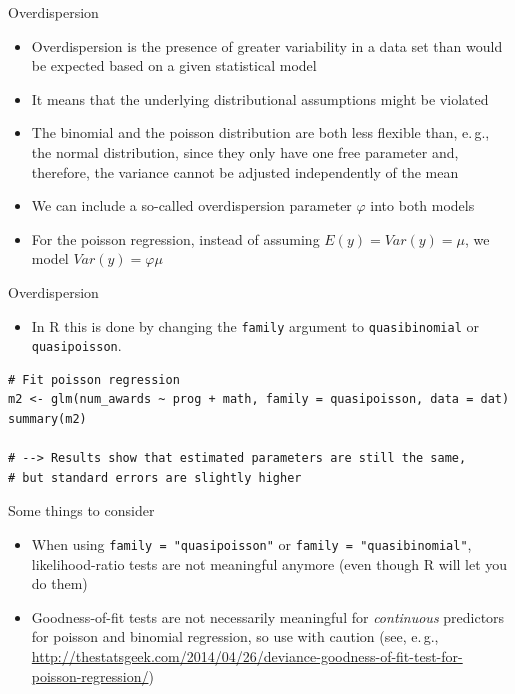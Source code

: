 \documentclass[aspectratio=169]{beamer}
\begin{document}
\begin{frame}{Overdispersion}
  \begin{itemize}
    \item Overdispersion is the presence of greater variability in a data
      set than would be expected based on a given statistical model
    \item It means that the underlying distributional assumptions might be
      violated
    \item The binomial and the poisson distribution are both less flexible
      than, e.\,g., the normal distribution, since they only have one free
      parameter and, therefore, the variance cannot be adjusted
      independently of the mean
    \item We can include a so-called overdispersion parameter $\varphi$
      into both models
    \item For the poisson regression, instead of assuming $E(y) = Var(y) =
      \mu$, we model $Var(y) = \varphi\mu$
  \end{itemize}
\end{frame}

\begin{frame}[fragile]{Overdispersion}
  \begin{itemize}
    \item In R this is done by changing the \texttt{family} argument to
      \texttt{quasibinomial} or \texttt{quasipoisson}.
  \end{itemize}
  \vfill
\begin{lstlisting}
# Fit poisson regression
m2 <- glm(num_awards ~ prog + math, family = quasipoisson, data = dat)
summary(m2)

# --> Results show that estimated parameters are still the same,
# but standard errors are slightly higher
\end{lstlisting}
\end{frame}

\begin{frame}{Some things to consider}
  \begin{itemize}
    \item When using \texttt{family = "quasipoisson"} or \texttt{family =
      "quasibinomial"}, likelihood-ratio tests are not meaningful anymore
      (even though R will let you do them)
    \item Goodness-of-fit tests are not necessarily meaningful for
      \emph{continuous} predictors for poisson and binomial regression, so
      use with caution
      (see, e.\,g.,
      \url{http://thestatsgeek.com/2014/04/26/deviance-goodness-of-fit-test-for-poisson-regression/})
  \end{itemize}
\end{frame}
\end{document}
